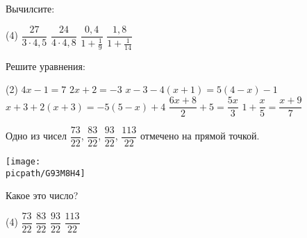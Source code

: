 \begin{homework}[number=4]
	\begin{listofex}
		\item Вычилсите:
		\begin{tasks}(4)
			\task \( \dfrac{27}{3\cdot4,5} \)
			\task \( \dfrac{24}{4\cdot4,8} \)
			\task \( \dfrac{0,4}{1+\frac{1}{9}} \)
			\task \( \dfrac{1,8}{1+\frac{1}{14}} \)
		\end{tasks}
		\item Решите уравнения:
		\begin{tasks}(2)
			\task \( 4x-1=7 \)
			\task \( 2x+2=-3 \)
			\task \( x-3-4(x+1)=5(4-x)-1 \)
			\task \( x+3+2(x+3)=-5(5-x)+4 \)
			\task \( \dfrac{6x+8}{2}+5=\dfrac{5x}{3} \)
			\task \( 1+\dfrac{x}{5}=\dfrac{x+9}{7} \)
		\end{tasks}
		\item Одно из чисел \( \dfrac{73}{22} \), \( \dfrac{83}{22} \), \( \dfrac{93}{22} \), \( \dfrac{113}{22} \) отмечено на прямой точкой.
		\begin{center}
			\texttt{[image: \\picpath/G93M8H4]}
		\end{center}
		Какое это число?
		\begin{tasks}(4)
			\task \( \dfrac{73}{22} \)
			\task \( \dfrac{83}{22} \)
			\task \( \dfrac{93}{22} \)
			\task \( \dfrac{113}{22} \)
		\end{tasks}
	\end{listofex}
\end{homework}

